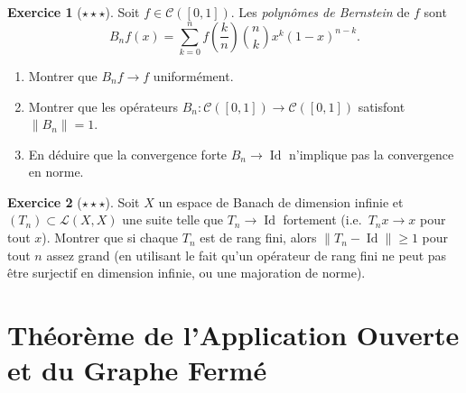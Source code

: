 \documentclass[a4paper,12pt]{book}
\DeclareMathOperator{\Id}{Id}
\newcommand{\norm}[1]{\left\| #1 \right\|}
\theoremstyle{definition}
\newtheorem{exercice}{Exercice}[chapter]
\theoremstyle{plain}
\theoremstyle{remark}
\begin{document}
\begin{exercice}[$\star\star\star$]
\label{exo:polynomes-bernstein}
Soit $f \in \mathcal{C}([0,1])$. Les \emph{polynômes de Bernstein} de $f$ sont
\[
  B_n f(x) = \sum_{k=0}^{n} f\!\left(\frac{k}{n}\right) \binom{n}{k} x^k (1-x)^{n-k}.
\]
\begin{enumerate}[label=(\alph*)]
  \item Montrer que $B_n f \to f$ uniformément.
  \item Montrer que les opérateurs $B_n : \mathcal{C}([0,1]) \to \mathcal{C}([0,1])$
    satisfont $\norm{B_n} = 1$.
  \item En déduire que la convergence forte $B_n \to \Id$ n'implique pas
    la convergence en norme.
\end{enumerate}
\end{exercice}

\begin{exercice}[$\star\star\star$]
\label{exo:non-convergence-uniforme}
Soit $X$ un espace de Banach de dimension infinie et $(T_n) \subset \mathcal{L}(X,X)$
une suite telle que $T_n \to \Id$ fortement (i.e.\ $T_n x \to x$ pour tout $x$).
Montrer que si chaque $T_n$ est de rang fini,
alors $\norm{T_n - \Id} \geq 1$ pour tout $n$ assez grand
(en utilisant le fait qu'un opérateur de rang fini ne peut pas être surjectif
en dimension infinie, ou une majoration de norme).
\end{exercice}




\chapter{Théorème de l'Application Ouverte et du Graphe Fermé}
\label{chap:app-ouverte-graphe-ferme}
\minitoc
\end{document}
